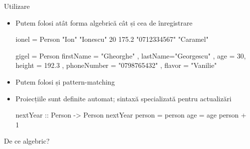 \documentclass[xcolor=pdftex,romanian,colorlinks]{beamer}
\begin{document}
\begin{frame}[fragile]{Utilizare}
\begin{itemize}
\item Putem folosi atât forma algebrică cât și cea de înregistrare
\begin{asciihs}
ionel = Person "Ion" "Ionescu" 20 175.2 
    "0712334567" "Caramel"

gigel = Person { firstName = "Gheorghe"
               , lastName="Georgescu"
               , age = 30, height = 192.3
               , phoneNumber = "0798765432"
               , flavor = "Vanilie" }
\end{asciihs}
\item Putem folosi și pattern-matching
\item Proiecțiile sunt definite automat; sintaxă specializată pentru actualizări%
\begin{asciihs}
nextYear :: Person -> Person
nextYear person = person { age = age person + 1 }
\end{asciihs}
\end{itemize}
\end{frame}

\begin{frame}{De ce algebric?}
\end{frame}
\end{document}
